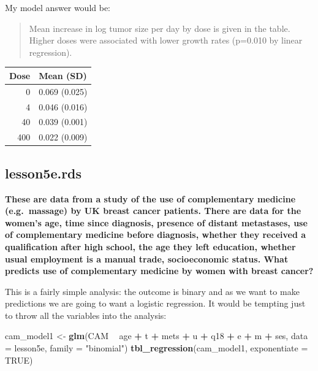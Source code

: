 \documentclass[]{book}
\newenvironment{Shaded}{\begin{snugshade}}{\end{snugshade}}
\newcommand{\DataTypeTok}[1]{\textcolor[rgb]{0.13,0.29,0.53}{#1}}
\newcommand{\KeywordTok}[1]{\textcolor[rgb]{0.13,0.29,0.53}{\textbf{#1}}}
\newcommand{\NormalTok}[1]{#1}
\newcommand{\OperatorTok}[1]{\textcolor[rgb]{0.81,0.36,0.00}{\textbf{#1}}}
\newcommand{\OtherTok}[1]{\textcolor[rgb]{0.56,0.35,0.01}{#1}}
\newcommand{\StringTok}[1]{\textcolor[rgb]{0.31,0.60,0.02}{#1}}
\begin{document}
My model answer would be:

\begin{quote}
Mean increase in log tumor size per day by dose is given in the table.
Higher doses were associated with lower growth rates (p=0.010 by linear
regression).
\end{quote}

\captionsetup[table]{labelformat=empty,skip=1pt}
\begin{longtable}{rl}
\toprule
Dose & Mean (SD) \\ 
\midrule
0 & 0.069 (0.025) \\ 
4 & 0.046 (0.016) \\ 
40 & 0.039 (0.001) \\ 
400 & 0.022 (0.009) \\ 
\bottomrule
\end{longtable}

\hypertarget{lesson5e.rds}{%
\subsection{lesson5e.rds}\label{lesson5e.rds}}

\textbf{These are data from a study of the use of complementary medicine
(e.g.~massage) by UK breast cancer patients. There are data for the
women's age, time since diagnosis, presence of distant metastases, use
of complementary medicine before diagnosis, whether they received a
qualification after high school, the age they left education, whether
usual employment is a manual trade, socioeconomic status. What predicts
use of complementary medicine by women with breast cancer?}

This is a fairly simple analysis: the outcome is binary and as we want
to make predictions we are going to want a logistic regression. It would
be tempting just to throw all the variables into the analysis:

\begin{Shaded}
\begin{Highlighting}[]
\NormalTok{cam_model1 <-}\StringTok{ }\KeywordTok{glm}\NormalTok{(CAM }\OperatorTok{~}\StringTok{ }\NormalTok{age }\OperatorTok{+}\StringTok{ }\NormalTok{t }\OperatorTok{+}\StringTok{ }\NormalTok{mets }\OperatorTok{+}\StringTok{ }\NormalTok{u }\OperatorTok{+}\StringTok{ }\NormalTok{q18 }\OperatorTok{+}\StringTok{ }\NormalTok{e }\OperatorTok{+}\StringTok{ }\NormalTok{m }\OperatorTok{+}\StringTok{ }\NormalTok{ses,}
                  \DataTypeTok{data =}\NormalTok{ lesson5e,}
                  \DataTypeTok{family =} \StringTok{"binomial"}\NormalTok{)}
\KeywordTok{tbl_regression}\NormalTok{(cam_model1, }\DataTypeTok{exponentiate =} \OtherTok{TRUE}\NormalTok{)}
\end{Highlighting}
\end{Shaded}
\end{document}
